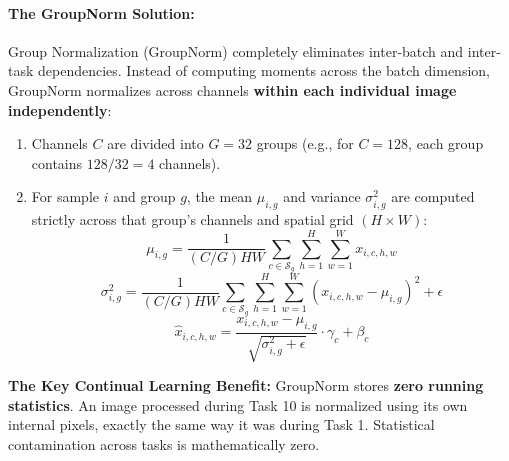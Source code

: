 \documentclass[11pt,a4paper]{article}
\begin{document}
\paragraph{The GroupNorm Solution:}
Group Normalization (GroupNorm) completely eliminates inter-batch and inter-task dependencies. Instead of computing moments across the batch dimension, GroupNorm normalizes across channels \textbf{within each individual image independently}:
\begin{enumerate}
    \item Channels $C$ are divided into $G = 32$ groups (e.g., for $C=128$, each group contains $128/32 = 4$ channels).
    \item For sample $i$ and group $g$, the mean $\mu_{i, g}$ and variance $\sigma_{i, g}^2$ are computed strictly across that group's channels and spatial grid $(H \times W)$:
    \begin{equation}
    \mu_{i, g} = \frac{1}{(C/G) H W} \sum_{c \in \mathcal{S}_g} \sum_{h=1}^H \sum_{w=1}^W x_{i, c, h, w}
    \end{equation}
    \begin{equation}
    \sigma_{i, g}^2 = \frac{1}{(C/G) H W} \sum_{c \in \mathcal{S}_g} \sum_{h=1}^H \sum_{w=1}^W (x_{i, c, h, w} - \mu_{i, g})^2 + \epsilon
    \end{equation}
    \begin{equation}
    \hat{x}_{i, c, h, w} = \frac{x_{i, c, h, w} - \mu_{i, g}}{\sqrt{\sigma_{i, g}^2 + \epsilon}} \cdot \gamma_c + \beta_c
    \end{equation}
\end{enumerate}
\textbf{The Key Continual Learning Benefit:} GroupNorm stores \textbf{zero running statistics}. An image processed during Task 10 is normalized using its own internal pixels, exactly the same way it was during Task 1. Statistical contamination across tasks is mathematically zero.
\end{document}
